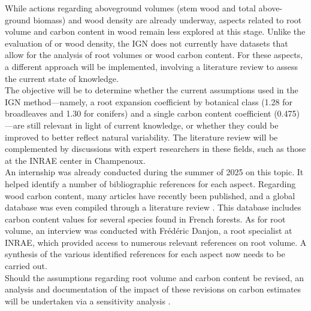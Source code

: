 While actions regarding aboveground volumes (stem wood and total above-ground biomass) and wood density are already underway, aspects related to root volume and carbon content in wood remain less explored at this stage. Unlike the evaluation of or wood density, the IGN does not currently have datasets that allow for the analysis of root volumes or wood carbon content. For these aspects, a different approach will be implemented, involving a literature review to assess the current state of knowledge. \\

The objective will be to determine whether the current assumptions used in the IGN method---namely, a root expansion coefficient by botanical class (1.28 for broadleaves and 1.30 for conifers) and a single carbon content coefficient (0.475)---are still relevant in light of current knowledge, or whether they could be improved to better reflect natural variability. The literature review will be complemented by discussions with expert researchers in these fields, such as those at the INRAE center in Champenoux. \\

An internship was already conducted during the summer of 2025 on this topic. It helped identify a number of bibliographic references for each aspect. Regarding wood carbon content, many articles have recently been published, and a global database was even compiled through a literature review \parencite{Doraisami2022}. This database includes carbon content values for several species found in French forests. As for root volume, an interview was conducted with Frédéric Danjon, a root specialist at INRAE, which provided access to numerous relevant references on root volume. A synthesis of the various identified references for each aspect now needs to be carried out. \\

Should the assumptions regarding root volume and carbon content be revised, an analysis and documentation of the impact of these revisions on carbon estimates will be undertaken via a sensitivity analysis \parencite{Iooss2017}.